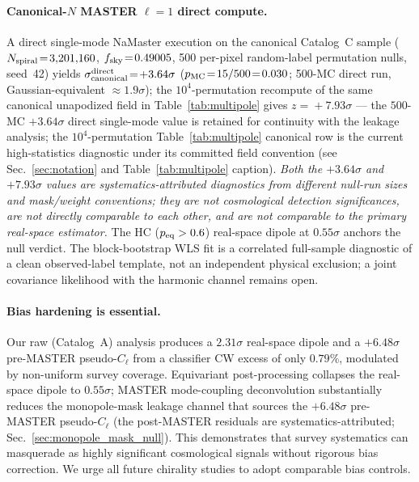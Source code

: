 \documentclass[aps,prd,twocolumn,superscriptaddress,preprintnumbers,nofootinbib,longbibliography,floatfix]{revtex4-2}
\newcommand{\sigmaunit}{\sigma}
\begin{document}
\paragraph{Canonical-$N$ MASTER $\ell\!=\!1$ direct compute.}
A direct single-mode NaMaster execution on the canonical Catalog~C sample ($N_{\rm spiral}\!=\!3{,}201{,}160$, $f_{\rm sky}\!=\!0.49005$, 500 per-pixel random-label permutation nulls, seed~42) yields $\sigma_{\rm canonical}^{\rm direct}\!=\!+3.64\sigmaunit$ ($p_{\rm MC}\!=\!15/500\!=\!0.030$; 500-MC direct run, Gaussian-equivalent $\approx\!1.9\sigmaunit$); the $10^4$-permutation recompute of the same canonical unapodized field in Table~\ref{tab:multipole} gives $z\!=\!+7.93\sigmaunit$ --- the $500$-MC $+3.64\sigmaunit$ direct single-mode value is retained for continuity with the leakage analysis; the $10^4$-permutation Table~\ref{tab:multipole} canonical row is the current high-statistics diagnostic under its committed field convention (see Sec.~\ref{sec:notation} and Table~\ref{tab:multipole} caption). \emph{Both the $+3.64\sigmaunit$ and $+7.93\sigmaunit$ values are systematics-attributed diagnostics from different null-run sizes and mask/weight conventions; they are not cosmological detection significances, are not directly comparable to each other, and are not comparable to the primary real-space estimator.} The HC ($p_{\rm eq}>0.6$) real-space dipole at $0.55\sigmaunit$ anchors the null verdict. The block-bootstrap WLS fit is a correlated full-sample diagnostic of a clean observed-label template, not an independent physical exclusion; a joint covariance likelihood with the harmonic channel remains open.

\paragraph{Bias hardening is essential.}
Our raw (Catalog~A) analysis produces a $2.31\sigmaunit$ real-space dipole and a $+6.48\sigmaunit$ pre-MASTER pseudo-$C_\ell$ from a classifier CW excess of only $0.79\%$, modulated by non-uniform survey coverage. Equivariant post-processing collapses the real-space dipole to $0.55\sigmaunit$; MASTER mode-coupling deconvolution substantially reduces the monopole-mask leakage channel that sources the $+6.48\sigmaunit$ pre-MASTER pseudo-$C_\ell$ (the post-MASTER residuals are systematics-attributed; Sec.~\ref{sec:monopole_mask_null}). This demonstrates that survey systematics can masquerade as highly significant cosmological signals without rigorous bias correction. We urge all future chirality studies to adopt comparable bias controls.
\end{document}
